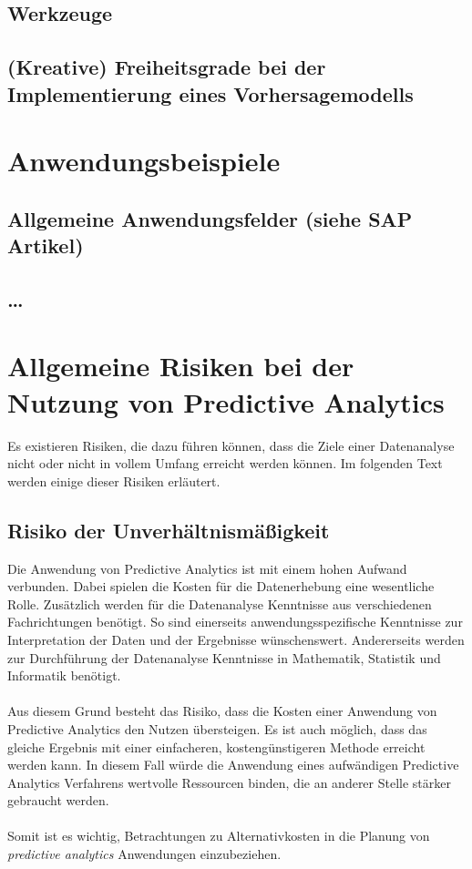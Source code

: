 \subsection{Werkzeuge}

\subsection{(Kreative) Freiheitsgrade bei der Implementierung eines
  Vorhersagemodells}

\section{Anwendungsbeispiele}

\subsection{Allgemeine Anwendungsfelder (siehe SAP Artikel)}

\subsection{\ldots}

\section{Allgemeine Risiken bei der Nutzung von Predictive Analytics}

Es existieren Risiken, die dazu führen können, dass die Ziele einer
Datenanalyse nicht oder nicht in vollem Umfang erreicht werden können.
Im folgenden Text werden einige dieser Risiken erläutert.

\subsection{Risiko der Unverhältnismäßigkeit}

Die Anwendung von Predictive Analytics ist mit einem hohen Aufwand verbunden.
Dabei spielen die Kosten für die Datenerhebung eine wesentliche Rolle.
Zusätzlich werden für die Datenanalyse Kenntnisse aus verschiedenen
Fachrichtungen benötigt. So sind einerseits anwendungsspezifische Kenntnisse
zur Interpretation der Daten und der Ergebnisse wünschenswert. Andererseits
werden zur Durchführung der Datenanalyse Kenntnisse in Mathematik, Statistik und
Informatik benötigt. \\ \\
Aus diesem Grund besteht das Risiko, dass die Kosten einer Anwendung von
Predictive Analytics den Nutzen übersteigen. Es ist auch möglich, dass das
gleiche Ergebnis mit einer einfacheren, kostengünstigeren Methode erreicht
werden kann. In diesem Fall würde die Anwendung eines aufwändigen Predictive
Analytics Verfahrens wertvolle Ressourcen binden, die an anderer Stelle stärker
gebraucht werden. \\ \\
Somit ist es wichtig, Betrachtungen zu Alternativkosten 
in die Planung von \emph{predictive analytics} Anwendungen einzubeziehen. 

